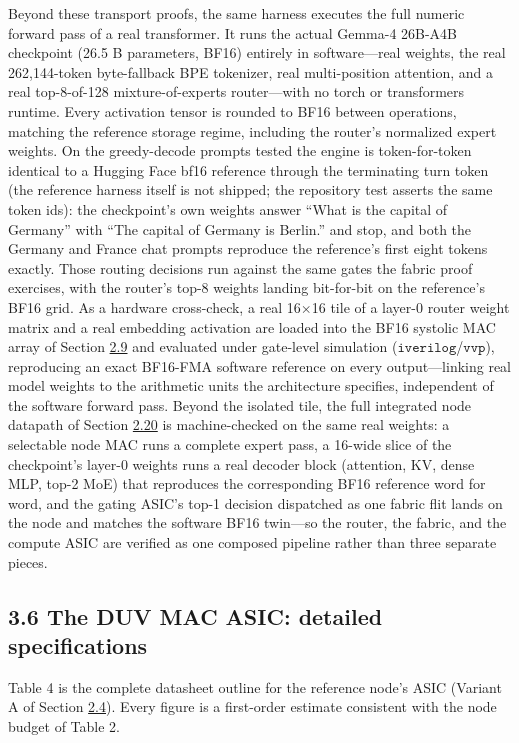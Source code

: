 \documentclass[10pt,twocolumn]{article}
\begin{document}
Beyond these transport proofs, the same harness executes the full numeric forward pass of a real transformer. It runs the actual Gemma-4 26B-A4B checkpoint (26.5 B parameters, BF16) entirely in software---real weights, the real 262{,}144-token byte-fallback BPE tokenizer, real multi-position attention, and a real top-8-of-128 mixture-of-experts router---with no torch or transformers runtime. Every activation tensor is rounded to BF16 between operations, matching the reference storage regime, including the router's normalized expert weights. On the greedy-decode prompts tested the engine is token-for-token identical to a Hugging Face bf16 reference through the terminating turn token (the reference harness itself is not shipped; the repository test asserts the same token ids): the checkpoint's own weights answer ``What is the capital of Germany'' with ``The capital of Germany is Berlin.'' and stop, and both the Germany and France chat prompts reproduce the reference's first eight tokens exactly. Those routing decisions run against the same gates the fabric proof exercises, with the router's top-8 weights landing bit-for-bit on the reference's BF16 grid. As a hardware cross-check, a real 16$\times$16 tile of a layer-0 router weight matrix and a real embedding activation are loaded into the BF16 systolic MAC array of Section \hyperref[sec:2.9]{2.9} and evaluated under gate-level simulation ($\texttt{iverilog}$/$\texttt{vvp}$), reproducing an exact BF16-FMA software reference on every output---linking real model weights to the arithmetic units the architecture specifies, independent of the software forward pass. Beyond the isolated tile, the full integrated node datapath of Section \hyperref[sec:2.20]{2.20} is machine-checked on the same real weights: a selectable node MAC runs a complete expert pass, a 16-wide slice of the checkpoint's layer-0 weights runs a real decoder block (attention, KV, dense MLP, top-2 MoE) that reproduces the corresponding BF16 reference word for word, and the gating ASIC's top-1 decision dispatched as one fabric flit lands on the node and matches the software BF16 twin---so the router, the fabric, and the compute ASIC are verified as one composed pipeline rather than three separate pieces.

\subsection*{3.6 The DUV MAC ASIC: detailed specifications}\label{sec:3.6}

Table 4 is the complete datasheet outline for the reference node's ASIC (Variant A of Section \hyperref[sec:2.4]{2.4}). Every figure is a first-order estimate consistent with the node budget of Table 2.
\end{document}
